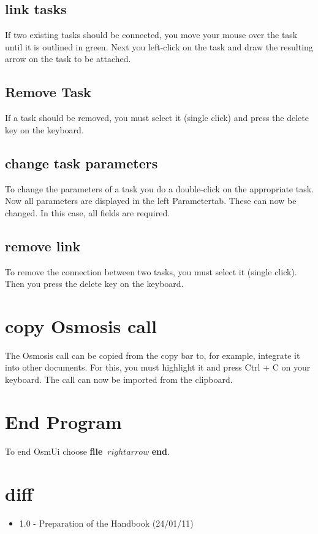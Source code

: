 \documentclass[a4paper,10pt]{scrartcl}
\begin{document}
\subsection {link tasks}
If two existing tasks should be connected, you move your mouse over the task until it is outlined in green. Next you left-click on the task and draw the resulting arrow on the task to be attached.
\subsection {Remove Task}
If a task should be removed, you must select it (single click) and press the delete key on the keyboard.
\subsection {change task parameters}
To change the parameters of a task you do a double-click on the appropriate task. Now all parameters are displayed in the left Parametertab. These can now be changed. In this case, all fields are required.
\subsection {remove link}
To remove the connection between two tasks, you must select it (single click). Then you press the delete key on the keyboard.

\section {copy Osmosis call}
The Osmosis call can be copied from the copy bar to, for example, integrate it into other documents. For this, you must highlight it and press Ctrl + C on your keyboard. The call can now be imported from the clipboard.


\section {End Program}
To end OsmUi choose \textbf {file} $ \ rightarrow $ \textbf {end}.

\section {diff}
\begin {itemize}
\item 1.0 - Preparation of the Handbook (24/01/11)
\end {itemize}
\end{document}
